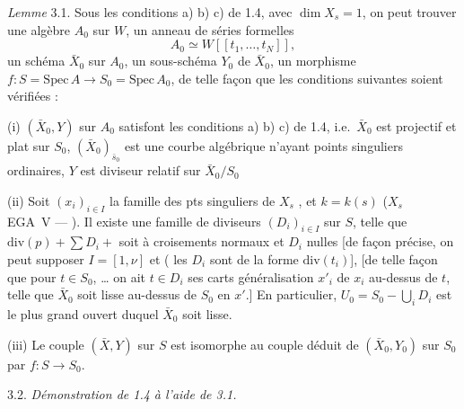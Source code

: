 \documentclass[11pt,a4paper]{article}
\begin{document}
\emph{Lemme} 3.1. Sous les conditions a) b) c) de 1.4, avec  $\dim X_s = 1$, on peut trouver une algèbre  $A_0$ sur $W$, \struck{\ill{}} un anneau de séries formelles
\[
A_0 \simeq W[[t_1, \ldots, t_N]] ,
\]
\struck{\ill{}} un schéma $\bar X_0$ sur $A_0$, un sous-schéma $Y_0$ de $\bar X_0$, \struck{\ill{}} un morphisme $f : S = \mathrm{Spec}\, A \to S_0 = \mathrm{Spec}\, A_0$, de telle façon que les conditions suivantes soient vérifiées :

(i) $(\bar X_0, Y)$ sur $A_0$ satisfont les conditions a) b) c) de 1.4, i.e.\ $\bar X_0$ est projectif et plat sur $S_0$, $(\bar X_0)_{\bar s_0}$  est une courbe \struck{\ill{}} algébrique \struck{\ill{}} n'ayant   points singuliers ordinaires, $Y$ est  diviseur relatif sur $\bar X_0/S_0$ 

(ii) Soit $(x_i)_{i \in I}$ la famille des pts singuliers de $X_s$ , \struck{\ill{}} et $k = k(s)$ ($X_s$  \ill{} \ill{} \ \ill{} EGA~V ---  \ill{}). Il existe une famille de diviseurs $(D_i)_{i \in I}$ \struck{\ill{}} sur $S$, telle  que  $\mathrm{div}(p) + \sum D_i +$ soit à croisements normaux et \struck{\ill{}}  $D_i$   nulles [de façon précise, on peut supposer $I = [1, \nu]$ et ( les $D_i$ sont de la forme $\mathrm{div}(t_i)$], [de telle façon que pour $t \in S_0$, … on ait $t \in D_i$ ses \uncertain{\ill{}} carts  généralisation $x'_i$ de $x_i$ au-dessus de $t$, telle que $\bar X_0$ soit lisse  au-dessus de $S_0$ en $x'$.] En particulier, $U_0 = S_0 - \bigcup_i D_i$ est le plus grand ouvert  duquel \struck{\ill{}} $\bar X_0$ soit lisse.

(iii) Le couple $(\bar X, Y)$ sur $S$ est isomorphe au couple déduit de $(\bar X_0, Y_0)$ sur $S_0$ par $f : S \to S_0$.


3.2. \emph{Démonstration de 1.4 à l'aide de 3.1.}
\end{document}
